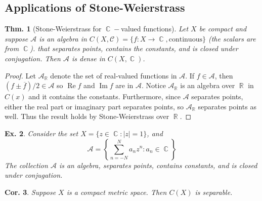 \documentclass[12pt, a4paper]{book}
\DeclareMathOperator{\R}{\mathbb{R}}
\DeclareMathOperator{\C}{\mathbb{C}}
\renewcommand{\Re}{\ensuremath{\operatorname{Re}}}
\renewcommand{\Im}{\ensuremath{\operatorname{Im}}}
\newtheorem{theorem}{Thm.}[section]
\newtheorem{corollary}[theorem]{Cor.}
\newtheorem{example}[theorem]{Ex.}
\theoremstyle{nonumberplain}
\newtheorem{proof}{Proof}
\begin{document}
\subsection{Applications of Stone-Weierstrass}
\begin{theorem}[Stone-Weierstrass for $\C-$valued functions]
    Let $X$ be compact and suppose $\mathcal{A}$ is an algebra in $C(X,\mathcal{C})=\{f:X\to\C,\text{continuous}\}$ (the scalars are from $\C$).
    that separates points, contains the constants, and is closed under conjugation.
    Then $\mathcal{A}$ is dense in $C(X,\C)$.
\end{theorem}
\begin{proof}
    Let $\mathcal{A}_{\R}$ denote the set of real-valued functions in $\mathcal{A}$.
    If $f\in\mathcal{A}$, then $(f\pm\overline{f})/2\in\mathcal{A}$ so $\Re f$ and $\Im f$ are in $\mathcal{A}$.
    Notice $\mathcal{A}_{\R}$ is an algebra over $\R$ in $C(x)$ and it contains the constants.
    Furthermore, since $\mathcal{A}$ separates points, either the real part or imaginary part separates points, so $\mathcal{A}_{\R}$ separates points as well.
    Thus the result holds by Stone-Weierstrass over $\R$.
\end{proof}
\begin{example}
    Consider the set $X=\{z\in\C:|z|=1\}$, and
    \[\mathcal{A}=\left\{\sum\limits_{n=-N}^Na_nz^n:a_n\in\C\right\}\]
    The collection $\mathcal{A}$ is an algebra, separates points, contains constants, and is closed under conjugation.
\end{example}
\begin{corollary}
    Suppose $X$ is a compact metric space.
    Then $C(X)$ is separable.
\end{corollary}
\end{document}
